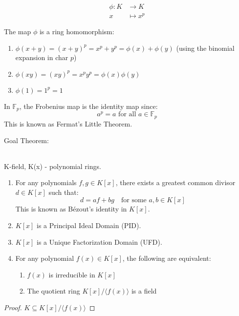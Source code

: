\documentclass{article}
\begin{document}
\begin{align*}
    \phi: K &\to K \\
    x &\mapsto x^p
\end{align*}

\begin{proposition}
The map $\phi$ is a ring homomorphism:
\begin{enumerate}
    \item $\phi(x + y) = (x + y)^p = x^p + y^p = \phi(x) + \phi(y)$ 
        \quad (using the binomial expansion in char $p$)
    \item $\phi(xy) = (xy)^p = x^p y^p = \phi(x)\phi(y)$
    \item $\phi(1) = 1^p = 1$
\end{enumerate}
\end{proposition}

\begin{example}
In $\mathbb{F}_p$, the Frobenius map is the identity map since:
\[ a^p = a \text{ for all } a \in \mathbb{F}_p \]
This is known as Fermat's Little Theorem.
\end{example}
 
Goal Theorem: 
\begin{theorem}\leavevmode \\ 
    K-field, K(x) - polynomial rings. 
    
    \begin{enumerate}
        \item For any polynomials $f,g \in K[x]$, there exists a greatest common divisor $d \in K[x]$ such that:
        \[ d = af + bg \quad \text{for some } a,b \in K[x] \]
        This is known as Bézout's identity in $K[x]$.
        
        \item $K[x]$ is a Principal Ideal Domain (PID).
        
        \item $K[x]$ is a Unique Factorization Domain (UFD).
        
        \item For any polynomial $f(x) \in K[x]$, the following are equivalent:
        \begin{enumerate}
            \item $f(x)$ is irreducible in $K[x]$
            \item The quotient ring $K[x]/\langle f(x) \rangle$ is a field
    \end{enumerate}
\end{enumerate}
\end{theorem}
\begin{proof}
    $ K \subseteq K[x] / \langle f(x) \rangle  $
\end{proof}
\end{document}
